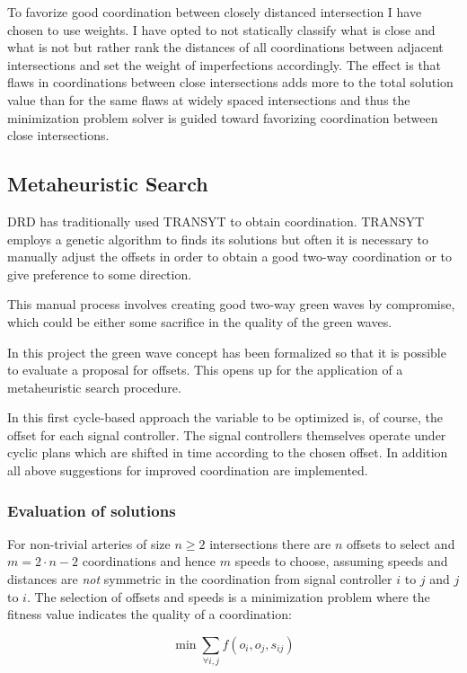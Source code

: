 To favorize good coordination between closely distanced intersection I have chosen to use weights.  I have opted to not statically classify what is close and what is not but rather rank the distances of all coordinations between adjacent intersections and set the weight of imperfections accordingly. The effect is that flaws in coordinations between close intersections adds more to the total solution value than for the same flaws at widely spaced intersections and thus the minimization problem solver is guided toward favorizing coordination between close intersections.

\subsection{Metaheuristic Search}
DRD has traditionally used TRANSYT to obtain coordination. TRANSYT employs a genetic algorithm to finds its solutions but often it is necessary to manually adjust the offsets in order to obtain a good two-way coordination or to give preference to some direction. 

This manual process involves creating good two-way green waves by compromise, which could be either some sacrifice in the quality of the green waves. 

In this project the green wave concept has been formalized so that it is possible to evaluate a proposal for offsets. This opens up for the application of a metaheuristic search procedure.

In this first cycle-based approach the variable to be optimized is, of course, the offset for each signal controller. The signal controllers themselves operate under cyclic plans which are shifted in time according to the chosen offset. In addition all above suggestions for improved coordination are implemented.

\subsubsection*{Evaluation of solutions}
\label{eval_coord}
For non-trivial arteries of size $n \geq 2$ intersections there are $n$ offsets to select and $m = 2 \cdot n - 2$ coordinations and hence $m$ speeds to choose, assuming speeds and distances are \textit{not} symmetric in the coordination from signal controller $i$ to $j$ and $j$ to $i$.
The selection of offsets and speeds is a minimization problem where the fitness value indicates the quality of a coordination:

$$ \min \sum_{\forall i,j} f(o_i,o_j,s_{ij})$$

